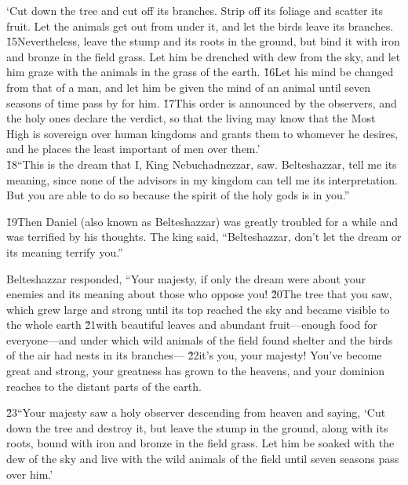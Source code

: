 \begin{poetry}
\poeml `Cut down the tree and cut off its branches. Strip off its foliage and scatter its fruit. Let the animals get out from under it, and let the birds leave its branches. \v{15}Nevertheless, leave the stump and its roots in the ground, but bind it with iron and bronze in the field grass. Let him be drenched with dew from the sky, and let him graze with the animals in the grass of the earth. \v{16}Let his mind be changed from that of a man, and let him be given the mind of an animal until seven seasons of time pass by for him. \v{17}This order is announced by the observers, and the holy ones declare the verdict, so that the living may know that the Most High is sovereign over human kingdoms and grants them to whomever he desires, and he places the least important of men over them.' \\
\poeml \v{18}``This is the dream that I, King Nebuchadnezzar, saw. Belteshazzar, tell me its meaning, since none of the advisors in my kingdom can tell me its interpretation. But you are able to do so because the spirit of the holy gods is in you.''
\end{poetry}

\v{19}Then Daniel (also known as Belteshazzar) was greatly troubled for a while and was terrified by his thoughts. The king said, ``Belteshazzar, don't let the dream or its meaning terrify you.''

Belteshazzar responded, ``Your majesty, if only the dream were about your enemies and its meaning about those who oppose you! \v{20}The tree that you saw, which grew large and strong until its top reached the sky and became visible to the whole earth \v{21}with beautiful leaves and abundant fruit---enough food for everyone---and under which wild animals of the field found shelter and the birds of the air had nests in its branches--- \v{22}it's you, your majesty! You've become great and strong, your greatness has grown to the heavens, and your dominion reaches to the distant parts of the earth.

\v{23}``Your majesty saw a holy observer descending from heaven and saying, `Cut down the tree and destroy it, but leave the stump in the ground, along with its roots, bound with iron and bronze in the field grass. Let him be soaked with the dew of the sky and live with the wild animals of the field until seven seasons pass over him.'

